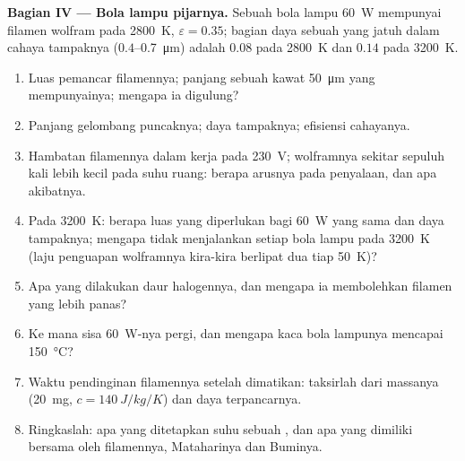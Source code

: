 \begin{problem}
\textbf{Bagian IV --- Bola lampu pijarnya.}
Sebuah bola lampu \qty{60}{W} mempunyai filamen wolfram pada \qty{2800}{K},
$\varepsilon = 0.35$; bagian daya sebuah  yang jatuh dalam
cahaya tampaknya ($0.4$--\qty{0.7}{\micro m}) adalah $0.08$ pada \qty{2800}{K} dan $0.14$
pada \qty{3200}{K}.
\begin{enumerate}[resume]
  \item Luas pemancar filamennya; panjang sebuah kawat \qty{50}{\micro m}
        yang mempunyainya; mengapa ia digulung?
  \item Panjang gelombang puncaknya; daya tampaknya; efisiensi cahayanya.
  \item Hambatan filamennya dalam kerja pada \qty{230}{V};
         wolframnya sekitar sepuluh kali lebih kecil pada suhu
        ruang: berapa arusnya pada penyalaan, dan apa akibatnya.
  \item Pada \qty{3200}{K}: berapa luas yang diperlukan bagi \qty{60}{W} yang sama dan
        daya tampaknya; mengapa tidak menjalankan setiap bola lampu pada \qty{3200}{K}
        (laju penguapan wolframnya kira-kira berlipat dua tiap
        \qty{50}{K})?
  \item Apa yang dilakukan daur halogennya, dan mengapa ia membolehkan filamen yang
        lebih panas?
  \item Ke mana sisa \qty{60}{W}-nya pergi, dan mengapa kaca bola
        lampunya mencapai \qty{150}{\celsius}?
  \item Waktu pendinginan filamennya setelah dimatikan: taksirlah dari
        massanya (\qty{20}{mg}, $c = \qty{140}{J/kg/K}$) dan daya terpancarnya.
  \item Ringkaslah: apa yang ditetapkan suhu sebuah , dan apa
        yang dimiliki bersama oleh filamennya, Mataharinya dan Buminya.
\end{enumerate}
\end{problem}
